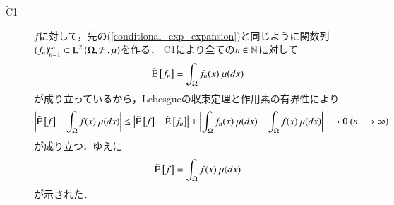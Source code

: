 	\begin{prf}\mbox{}
		\begin{description}
			\item[$\tilde{\mathrm{C}}$1]
				$f$に対して，先の(\ref{conditional_exp_expansion})と同じように関数列$(f_n)_{n=1}^{\infty} \subset \operatorname{L}^{2} \left(\Omega,\mathcal{F},\mu\right)$を作る．
				C1により全ての$n \in \mathbb{N}$に対して
				\begin{align}
					\tilde{\operatorname{E}} \left[ f_n \right] = \int_{\Omega} f_n(x)\ \mu(dx)
				\end{align}
				が成り立っているから，Lebesgueの収束定理と作用素の有界性により
				\begin{align}
					\left| \tilde{\operatorname{E}} \left[ f \right] - \int_{\Omega} f(x)\ \mu(dx) \right|
					\leq \left| \tilde{\operatorname{E}} \left[ f \right] - \tilde{\operatorname{E}} \left[ f_n \right] \right| + \left| \int_{\Omega} f_n(x)\ \mu(dx) - \int_{\Omega} f(x)\ \mu(dx) \right|
					\longrightarrow 0\ (n \longrightarrow \infty)
				\end{align}
				が成り立つ．ゆえに
				\begin{align}
					\tilde{\operatorname{E}} \left[ f \right] = \int_{\Omega} f(x)\ \mu(dx)
				\end{align}
				が示された．
				

\end{description}
\end{prf}
